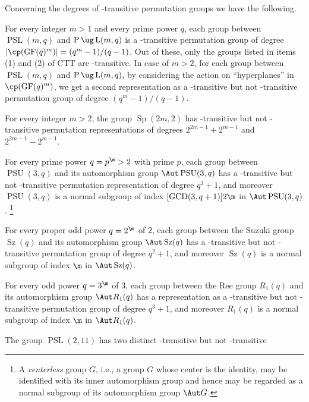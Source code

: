  Concerning the degrees of 
-transitive permutation
groups we have the following.
\roster
\item
For every integer $m>1$ and every prime power $q$, each 
group between
$\operatorname{PSL}(m,q)$ and 
$\operatorname{P}\ug\operatorname{L}(m,q)$ is a
-transitive 
permutation group of degree 
$|\cp(\operatorname{GF}(q)^m)|=(q^m-1)/(q-1)$. Out of 
these,
only the groups listed in items {\rm(1)} and {\rm(2)} of 
CTT are -transitive.
In case of $m>2$, for each group between 
$\operatorname{PSL}(m,q)$ and 
$\operatorname{P}\ug\operatorname{L}(m,q)$,
by considering the action on ``hyperplanes'' in 
$\cp(\operatorname{GF}(q)^m)$, we get a
second representation as a -transitive but not 
-transitive permutation
group of degree $(q^m-1)/(q-1)$.
\item
For every integer $m>2$, the group 
$\operatorname{Sp}(2m,2)$ has  -transitive but
not -transitive permutation representations of degrees 
$2^{2m-1}+2^{m-1}$
and $2^{2m-1}-2^{m-1}$.
\item 
For every prime power $q=p^{\m}>2$ with prime $p$, each 
group between 
$\operatorname{PSU}(3,q)$ and its automorphism group $\Aut
\operatorname{PSU}(3,q)$ has a -transitive but
not -transitive permutation representation of degree 
$q^3+1$, and moreover
$\operatorname{PSU}(3,q)$ is a normal subgroup of index 
$[\operatorname{GCD}(3,q+1)]2\m$ in 
$\Aut \operatorname{PSU}(3,q)$.
\footnote{A {\it centerless} group $G$, i.e., a group $G$ 
whose center
is the identity, may be identified with its inner 
automorphism group and
hence may be regarded as a normal subgroup of its 
automorphism
group $\Aut G$.} 
\item
For every proper odd power $q=2^{\m}$ of $2$, each group 
between the Suzuki 
group $\operatorname{Sz}(q)$ and its automorphism group 
$\Aut \operatorname{Sz}(q)$ has 
a -transitive but not -transitive permutation 
group of degree $q^2+1$,
and moreover $\operatorname{Sz}(q)$ is a normal subgroup 
of index $\m$ in $\Aut \operatorname{Sz}(q)$.
\item
For every odd power $q=3^{\m}$ of $3$, each group between 
the Ree group 
$R_1(q)$ and its automorphism group $\Aut R_1(q)$ has a 
representation as a 
-transitive but not -transitive permutation group 
of degree $q^3+1$,
and moreover $R_1(q)$ is a normal subgroup of index $\m$ 
in $\Aut R_1(q)$.
\item
The group $\operatorname{PSL}(2,11)$ has two distinct 
-transitive but not 
-transitive 
